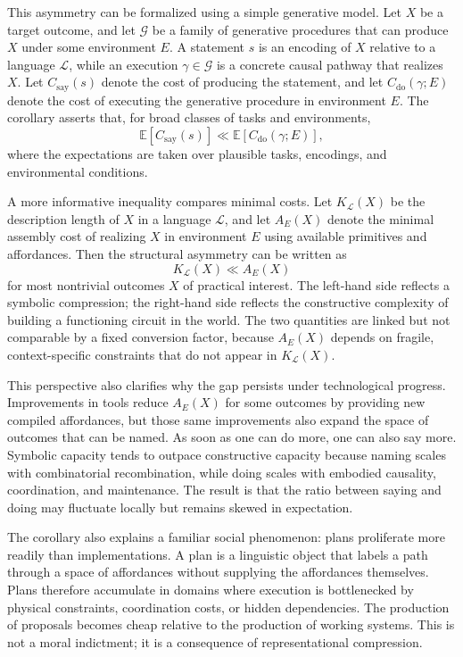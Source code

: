 \documentclass[12pt]{article}
\begin{document}
This asymmetry can be formalized using a simple generative model. Let $X$ be a target outcome, and let $\mathcal{G}$ be a family of generative procedures that can produce $X$ under some environment $E$. A statement $s$ is an encoding of $X$ relative to a language $\mathcal{L}$, while an execution $\gamma \in \mathcal{G}$ is a concrete causal pathway that realizes $X$. Let $C_{\mathrm{say}}(s)$ denote the cost of producing the statement, and let $C_{\mathrm{do}}(\gamma;E)$ denote the cost of executing the generative procedure in environment $E$. The corollary asserts that, for broad classes of tasks and environments,
\[
\mathbb{E}\!\left[C_{\mathrm{say}}(s)\right] \ll \mathbb{E}\!\left[C_{\mathrm{do}}(\gamma;E)\right],
\]
where the expectations are taken over plausible tasks, encodings, and environmental conditions.

A more informative inequality compares minimal costs. Let $K_{\mathcal{L}}(X)$ be the description length of $X$ in a language $\mathcal{L}$, and let $A_E(X)$ denote the minimal assembly cost of realizing $X$ in environment $E$ using available primitives and affordances. Then the structural asymmetry can be written as
\[
K_{\mathcal{L}}(X) \ll A_E(X)
\]
for most nontrivial outcomes $X$ of practical interest. The left-hand side reflects a symbolic compression; the right-hand side reflects the constructive complexity of building a functioning circuit in the world. The two quantities are linked but not comparable by a fixed conversion factor, because $A_E(X)$ depends on fragile, context-specific constraints that do not appear in $K_{\mathcal{L}}(X)$.

This perspective also clarifies why the gap persists under technological progress. Improvements in tools reduce $A_E(X)$ for some outcomes by providing new compiled affordances, but those same improvements also expand the space of outcomes that can be named. As soon as one can do more, one can also say more. Symbolic capacity tends to outpace constructive capacity because naming scales with combinatorial recombination, while doing scales with embodied causality, coordination, and maintenance. The result is that the ratio between saying and doing may fluctuate locally but remains skewed in expectation.

The corollary also explains a familiar social phenomenon: plans proliferate more readily than implementations. A plan is a linguistic object that labels a path through a space of affordances without supplying the affordances themselves. Plans therefore accumulate in domains where execution is bottlenecked by physical constraints, coordination costs, or hidden dependencies. The production of proposals becomes cheap relative to the production of working systems. This is not a moral indictment; it is a consequence of representational compression.
\end{document}
